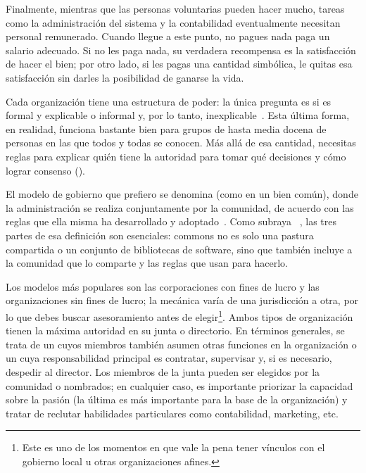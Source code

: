 Finalmente,
mientras que las personas voluntarias pueden hacer mucho, 
tareas como la administración del sistema y la contabilidad eventualmente necesitan personal remunerado.
Cuando llegue a este punto, no pagues nada paga un salario adecuado.
Si no les paga nada, su verdadera recompensa es la satisfacción de hacer el bien;
por otro lado, si les pagas una cantidad simbólica, le quitas esa satisfacción sin darles la posibilidad de ganarse la vida.


Cada organización tiene una estructura de poder:
la única pregunta es si es formal y explicable o informal y, por lo tanto, inexplicable~\cite{Free1972}.
Esta última forma, en realidad, funciona bastante bien para grupos de hasta media docena de personas 
en las que todos y todas se conocen.
Más allá de esa cantidad, 
necesitas reglas para explicar 
quién tiene la autoridad para tomar qué decisiones 
y cómo lograr consenso ().

El modelo de gobierno que prefiero se denomina  (como en un bien común),
donde la administración se realiza conjuntamente por la comunidad, de acuerdo con las reglas que ella misma ha desarrollado y adoptado~\cite{Ostr2015}.
Como subraya ~\cite{Boll2014}, las tres partes de esa definición son esenciales:
commons no es solo una pastura compartida o un conjunto de bibliotecas de software, 
sino que también incluye a la comunidad que lo comparte y las reglas que usan para hacerlo.

Los modelos más populares son las corporaciones con fines de lucro y las organizaciones sin fines de lucro; 
la mecánica varía de una jurisdicción a otra, 
por lo que debes buscar asesoramiento antes de elegir\footnote{
  Este es uno de los momentos 
  en que vale la pena tener vínculos con el gobierno local u otras organizaciones afines.}.
Ambos tipos de organización tienen la máxima autoridad en su junta o directorio.
En términos generales, se trata de un  
cuyos miembros también asumen otras funciones en la organización 
o un  cuya responsabilidad principal es contratar, supervisar 
y, si es necesario, despedir al director.
Los miembros de la junta pueden ser elegidos por la comunidad o nombrados; 
en cualquier caso, es importante priorizar la capacidad sobre la pasión 
(la última es más importante para la base de la organización) 
y tratar de reclutar habilidades particulares como contabilidad, marketing, etc.

